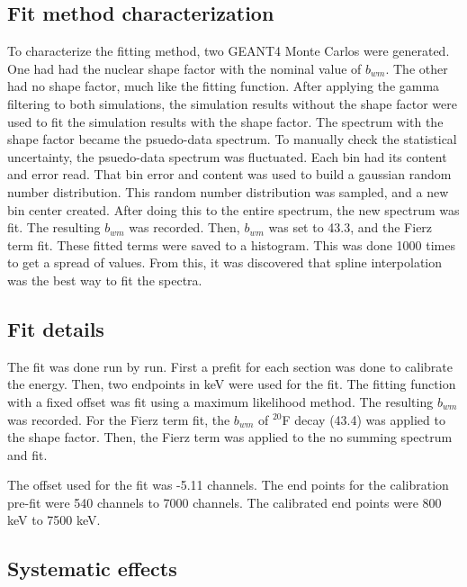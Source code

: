 \subsection{Fit method characterization}
To characterize the fitting method, two GEANT4 Monte Carlos were generated.
One had had the nuclear shape factor with the nominal value of $b_{wm}$. 
The other had no shape factor, much like the fitting function.
After applying the gamma filtering to both simulations, the simulation results without the shape factor were used to fit the simulation results with the shape factor.
The spectrum with the shape factor became the psuedo-data spectrum.
To manually check the statistical uncertainty, the psuedo-data spectrum was fluctuated.
Each bin had its content and error read. 
That bin error and content was used to build a gaussian random number distribution.
This random number distribution was sampled, and a new bin center created.
After doing this to the entire spectrum, the new spectrum was fit.
The resulting $b_{wm}$ was recorded.
Then, $b_{wm}$ was set to 43.3, and the Fierz term fit. 
These fitted terms were saved to a histogram.
This was done 1000 times to get a spread of values.
From this, it was discovered that spline interpolation was the best way to fit the spectra.

\subsection{Fit details}
The fit was done run by run.
First a prefit for each section was done to calibrate the energy.
Then, two endpoints in keV were used for the fit.
The fitting function with a fixed offset was fit using a maximum likelihood method.
The resulting $b_{wm}$ was recorded.
For the Fierz term fit, the $b_{wm}$ of $^{20}$F decay (43.4) was applied to the shape factor.
Then, the Fierz term was applied to the no summing spectrum and fit. 

The offset used for the fit was -5.11 channels.
The end points for the calibration pre-fit were 540 channels to 7000 channels.
The calibrated end points were 800 keV to 7500 keV. 
 
\subsection{Systematic effects}
